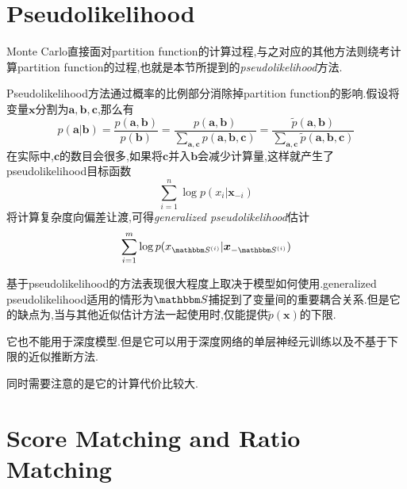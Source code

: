 \section{Pseudolikelihood}

Monte Carlo直接面对partition function的计算过程,与之对应的其他方法则绕考计算partition function的过程,也就是本节所提到的\textit{pseudolikelihood}方法.

Pseudolikelihood方法通过概率的比例部分消除掉partition function的影响.假设将变量$\bm x$分割为$\bm a, \bm b, \bm c$,那么有
\begin{equation}
p(\bm a|\bm b)=\frac{p(\bm{a,b})}{p(\bm b)}=\frac{p(\bm{a,b})}{\sum_{\bm{a,c}}p(\bm {a,b,c})}=\frac{\tilde p(\bm{a,b})}{\sum_{\bm{a,c}}\tilde p(\bm {a,b,c})}
\end{equation}
在实际中,$\bm c$的数目会很多,如果将$\bm c$并入$\bm b$会减少计算量,这样就产生了pseudolikelihood目标函数
\begin{equation}
\sum_{i=1}^n\log p(x_i|\bm x_{-i})
\end{equation}
将计算复杂度向偏差让渡,可得\textit{generalized pseudolikelihood}估计
\begin{equation}
\sum_{i=1}^m\log p(x_{\mathbbm S^{(i)}}|\bm x_{-{\mathbbm S^{(i)}}})
\end{equation}

基于pseudolikelihood的方法表现很大程度上取决于模型如何使用.generalized pseudolikelihood适用的情形为$\mathbbm S$捕捉到了变量间的重要耦合关系.但是它的缺点为,当与其他近似估计方法一起使用时,仅能提供$\tilde p(\bm x)$的下限.

它也不能用于深度模型.但是它可以用于深度网络的单层神经元训练以及不基于下限的近似推断方法.

同时需要注意的是它的计算代价比较大.

\section{Score Matching and Ratio Matching}

